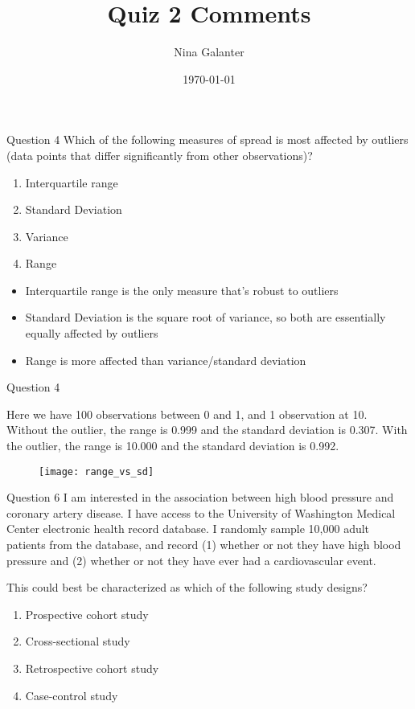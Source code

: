 \documentclass[10pt,t]{beamer}
\title{Quiz 2 Comments}
\author{Nina Galanter}
\date{\today}
\begin{document}
	\begin{frame}
	\titlepage 
\end{frame}

\begin{frame}{Question 4}
	Which of the following measures of spread is most affected by outliers (data points that differ significantly from other observations)?
	\medskip
	\begin{enumerate}
		\item Interquartile range
		\medskip
		\item Standard Deviation
		\medskip
		\item Variance
		\medskip
		\item {\color{green}Range}
	\end{enumerate}
\medskip
\begin{itemize}
	\item Interquartile range is the only measure that's robust to outliers
	\smallskip
	\item Standard Deviation is the square root of variance, so both are essentially equally affected by outliers
	\smallskip
	\item Range is more affected than variance/standard deviation
\end{itemize}
\end{frame}

\begin{frame}{Question 4}
	
	\vspace{-5 mm}
	Here we have 100 observations between 0 and 1, and 1 observation at 10. Without the outlier, the range is {\color{blue}0.999} and the standard deviation is {\color{violet}0.307}. With the outlier, the range is {\color{blue}10.000} and the standard deviation is {\color{violet}0.992}. 

\begin{figure}
	\centering
	\texttt{[image: range\_vs\_sd]}
\end{figure}

\end{frame}

\begin{frame}{Question 6}
	I am interested in the association between high blood pressure and coronary artery disease. I have access to the University of Washington Medical Center electronic health record database. I randomly sample 10,000 adult patients from the database, and record (1) whether or not they have high blood pressure and (2) whether or not they have ever had a cardiovascular event. 
	\medskip
	
	This could best be characterized as which of the following study designs? 
	\medskip
	\begin{enumerate}
		\item Prospective cohort study
		\medskip
		\item Cross-sectional study
		\medskip
		\item {\color{green}Retrospective cohort study}
		\medskip
		\item Case-control study
	\end{enumerate}


\end{frame}
\end{document}
